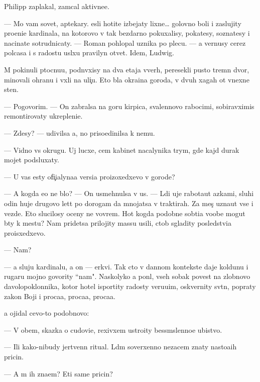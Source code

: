 \documentclass[10pt]{book}
\begin{document}
Philipp zaplakal, zam{\yi}cal aktivne{\y}e.

— Mo{\y} vam sovet, aptekary. {\Y}esli hotite izbejaty lixne{\y}… golovno{\y} boli i zaslujity pro{\x}eni{\y}e kardinala, na kotorovo v{\yi} tak bezdarno pokuxalisy, poka{\y}tesy, sozna{\y}tesy i nacina{\y}te sotrudnicaty. — Roman pohlopal uznika po plecu. — {\Y}a vernusy cerez polcasa i s radost{\y}u usl{\yi}xu pravilyn{\yi}{\y} otvet. Idem, Ludwig.

M{\yi} pokinuli p{\yi}tocnu{\y}u, podn{\ia}vxisy na dva etaja vverh, peresekli pusto{\y} t{\iu}remn{\yi}{\y} dvor, minovali ohranu i v{\yi}xli na uli{\c}u. Eto b{\yi}la okra{\y}ina goroda, v dvuh xagah ot vnexne{\y} sten{\yi}.

— Pogovorim. — On zabralsa na goru kirpica, svalennovo rabocimi, sobiravximis{\ia} remontirovaty ukrepleni{\y}e.

— Zdesy? — udivilsa {\y}a, no priso{\y}edinilsa k nemu.

— Vidno vs{\iu} okrugu. Uj lucxe, cem kabinet nacalynika t{\iu}rym{\yi}, gde kajd{\yi}{\y} durak mojet podsluxaty.

— U vas {\y}esty ofi{\c}ialyna{\y}a versi{\y}a proizoxedxevo v gorode?

— A kogda {\y}e{\y}o ne b{\yi}lo? — On usmehnulsa v us{\yi}. — L{\iu}di uje rabota{\y}ut {\y}az{\yi}kami, sluhi odin huje drugovo let{\ia}t po dorogam da mnojatsa v traktirah. Za mes{\ia}{\c} uzna{\y}ut vse i vezde. Eto slucilosy oceny ne vovrem{\ia}. Hot{\ia} kogda podobn{\yi}{\y}e sob{\yi}ti{\y}a voob{\x}e mogut b{\yi}ty k mestu? Nam pridetsa prilojity massu usili{\y}, ctob{\yi} sgladity posledstvi{\y}a proisxedxevo.

— Nam?

— {\Y}a sluju kardinalu, a on — {\C}erkvi. Tak cto v dannom kontekste daje koldunu i rugaru mojno govority ``nam". Naskolyko {\y}a pon{\ia}l, vseh sobak poves{\ia}t na zlobnovo d{\y}avolopoklonnika, kotor{\yi}{\y} hotel isportity radosty veru{\y}u{\x}im, oskvernity sv{\ia}t{\yi}n{\iu}, popraty zakon{\yi} Boj{\yf}i i proca{\y}a, proca{\y}a, proca{\y}a.

{\Y}a ojidal cevo-to podobnovo:

— V ob{\x}em, skazka o cudovi{\x}e, rexivxem ustro{\y}ity bessm{\yi}slenno{\y}e ubi{\y}stvo.

— Ili kako{\y}-nibudy jertvenn{\yi}{\y} ritual. L{\iu}d{\ia}m soverxenno nezacem znaty nasto{\y}a{\x}ih pricin.

— A m{\yi} ih zna{\y}em? Eti sam{\yi}{\y}e pricin{\yi}?
\end{document}

